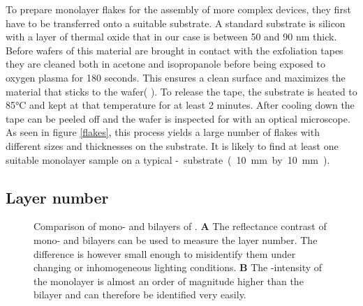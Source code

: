 To prepare monolayer flakes for the assembly of more complex devices, they first have to be transferred onto a suitable substrate. A standard substrate is silicon with a layer of thermal oxide that in our case is between 50 and 90 nm thick. Before wafers of this material are brought in contact with the exfoliation tapes they are cleaned both in acetone and isopropanole before being exposed to oxygen plasma for 180 seconds. This ensures a clean surface and maximizes the material that sticks to the wafer( \cite{pizzocchero_hot_2016}). To release the tape, the substrate is heated to 85°C and kept at that temperature for at least 2 minutes. After cooling down the tape can be peeled off and the wafer is inspected for with an optical microscope. As seen in figure \ref{flakes}, this process yields a large number of flakes with different sizes and thicknesses on the substrate. It is likely to find at least one suitable monolayer sample on a typical \si-substrate (10 mm by 10 mm). 

\subsection{Layer number}

\begin{figure}
	\centering
	\begin{subfigure}{0.4\textwidth}
	\caption{}
	\end{subfigure}
	\begin{subfigure}{0.4\textwidth}
	\caption{}
	\end{subfigure}
	\caption{Comparison of mono- and bilayers of \wse\!. \textbf{A} The reflectance contrast of mono- and bilayers can be used to measure the layer number. The difference is however small enough to misidentify them under changing or inhomogeneous lighting conditions. \textbf{B} The \pl-intensity of the monolayer is almost an order of magnitude higher than the bilayer and can therefore be identified very easily.}
	\label{pl-contrast}
\end{figure}

